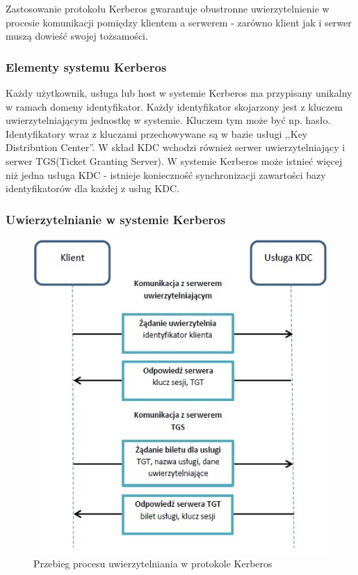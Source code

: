 			Zastosowanie protokołu Kerberos gwarantuje obustronne uwierzytelnienie w procesie komunikacji pomiędzy klientem a serwerem - zarówno klient jak i serwer muszą dowieść swojej tożsamości. 

		\subsubsection{Elementy systemu Kerberos}

			Każdy użytkownik, usługa lub host w systemie Kerberos ma przypisany unikalny w ramach domeny identyfikator\cite{Garman03}. Każdy identyfikator skojarzony jest z kluczem uwierzytelniającym jednostkę w systemie. Kluczem tym może być np. hasło. Identyfikatory wraz z kluczami przechowywane są w bazie usługi ,,Key Distribution Center''. W skład KDC wchodzi również serwer uwierzytelniający i serwer TGS(Ticket Granting Server). W systemie Kerberos może istnieć więcej niż jedna usługa KDC - istnieje konieczność synchronizacji zawartości bazy identyfikatorów dla każdej z usług KDC.

		\subsubsection{Uwierzytelnianie w systemie Kerberos}

			\begin{figure}[h]
				\centering
					\includegraphics{img/kerberos.jpg}
				\caption{Przebieg procesu uwierzytelniania w protokole Kerberos}
				\label{Przebieg procesu uwierzytelniania w protokole Kerberos}
			\end{figure}

